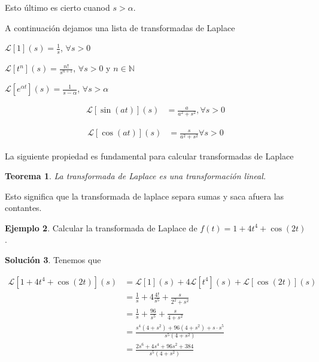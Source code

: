 \documentclass{article}
\theoremstyle{plain}
\newtheorem{thm}{Teorema}[section]
\theoremstyle{definition}
\newtheorem{ejem}[thm]{Ejemplo}
\newtheorem{sol}[thm]{Solución}
\begin{document}
Esto último es cierto cuanod $s >\alpha$.

\newpage

A continuación dejamos una lista de transformadas de Laplace


\begin{center}
$\displaystyle \mathcal{L}[1](s) = \frac{1}{s}$, $\forall s>0$
\end{center}

\begin{center}
$\displaystyle \mathcal{L}[t^n](s) = \frac{n!}{s^{n+1}}$, $\forall s>0$ y $n \in \mathbb{N}$
\end{center}

\begin{center}
$\displaystyle \mathcal{L}[e^{\alpha t}](s) = \frac{1}{s-\alpha}$, $\forall s>\alpha$
\end{center}

\begin{align*}
\displaystyle \mathcal{L}[\sin(at)](s) &= \frac{a}{a^2+s^2}, \forall s>0
\end{align*}

\begin{align*}
\displaystyle \mathcal{L}[\cos(at)](s) &= \frac{s}{a^2+s^2} \forall s>0
\end{align*}


La siguiente propiedad es fundamental para calcular transformadas de Laplace\\

\begin{thm}La transformada de Laplace es una transformación lineal. \\
\end{thm}

Esto significa que la transformada de laplace separa sumas y saca afuera las contantes. \\

\begin{ejem}Calcular la transformada de Laplace de $f(t)=1+4t^4+\cos(2t)$. \\
\end{ejem}

\begin{sol}Tenemos que
\end{sol}

\begin{align*}
\displaystyle \mathcal{L}[1+4t^4+\cos(2t)](s) &= \mathcal{L}[1](s)+ 4 \mathcal{L}[t^4](s)+\mathcal{L}[\cos(2t)](s) \\
&= \frac{1}{s} + 4 \frac{4!}{s^5} + \frac{s}{2^2+s^2}\\
&= \frac{1}{s} + \frac{96}{s^5} + \frac{s}{4+s^2}\\
&= \frac{s^4(4+s^2)+ 96(4+s^2) + s \cdot s^5}{s^5(4+s^2)}\\
&= \frac{2s^6 +4s^4+96s^2+384}{s^5(4+s^2)}\\
\end{align*}
\end{document}
